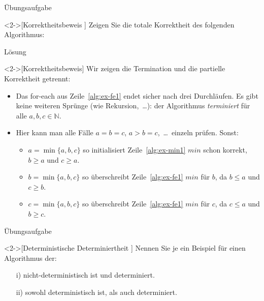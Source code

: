 \begin{frame}[c]{Übungsaufgabe}
    \begin{exercise}<2->[Korrektheitsbeweis ]
        Zeigen Sie die totale Korrektheit des folgenden Algorithmus:\smallskip\par
{}
    \end{exercise}
\end{frame}

\begin{frame}[c]{Lösung}
    \begin{solve}<2->[Korrektheitsbeweis]
       \pause{}Wir zeigen die Termination und die partielle Korrektheit getrennt: \begin{itemize}[<+(1)->]
           \item Das for-each aus Zeile~\ref{alg:ex-fe1} endet sicher nach drei Durchläufen. Es gibt keine weiteren Sprünge (wie Rekursion,~\ldots): der Algorithmus \emph{terminiert} für alle \(a, b, c \in \mathbb{N}\).
           \item Hier kann man alle Fälle \(a = b = c\), \(a > b = c\),~\ldots\ einzeln prüfen. Sonst: \begin{itemize}
             \item \(a = \min\{a, b, c\}\) so initialisiert Zeile~\ref{alg:ex-min1} \(min\) schon korrekt, \(b \geq a\) und \(c \geq a\).
             \item \(b = \min\{a, b, c\}\) so überschreibt Zeile~\ref{alg:ex-fe1} \(min\) für \(b\), da \(b \leq a\) und \(c \geq b\).
             \item \(c = \min\{a, b, c\}\) so überschreibt Zeile~\ref{alg:ex-fe1} \(min\) für \(c\), da \(c \leq a\) und \(b \geq c\).
           \end{itemize}
       \end{itemize}
    \end{solve}
\end{frame}

\begin{frame}[c]{Übungsaufgabe}
    \begin{exercise}<2->[Deterministische Determiniertheit ]
        \pause{}Nennen Sie je ein Beispiel für einen Algorithmus der:
        \begin{enumerate}[<+(1)->]
            \item[i)] nicht-deterministisch ist und determiniert.
            \item[ii)] sowohl deterministisch ist, als auch determiniert.
        \end{enumerate}
    \end{exercise}
\end{frame}

